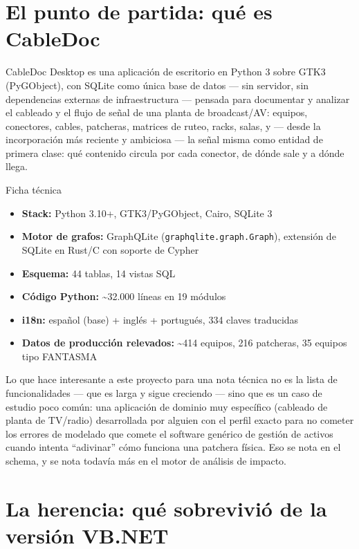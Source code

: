 \documentclass[11pt,twocolumn]{article}
\begin{document}
\section{El punto de partida: qué es CableDoc}

CableDoc Desktop es una aplicación de escritorio en Python 3 sobre GTK3 (PyGObject), con SQLite como única base de datos --- sin servidor, sin dependencias externas de infraestructura --- pensada para documentar y analizar el cableado y el flujo de señal de una planta de broadcast/AV: equipos, conectores, cables, patcheras, matrices de ruteo, racks, salas, y --- desde la incorporación más reciente y ambiciosa --- la señal misma como entidad de primera clase: qué contenido circula por cada conector, de dónde sale y a dónde llega.

\begin{specbox}{Ficha técnica}
\begin{itemize}[leftmargin=1.1em,itemsep=1pt,topsep=2pt]
\item \textbf{Stack:} Python 3.10+, GTK3/PyGObject, Cairo, SQLite 3
\item \textbf{Motor de grafos:} GraphQLite (\texttt{graphqlite.graph.Graph}), extensión de SQLite en Rust/C con soporte de Cypher
\item \textbf{Esquema:} 44 tablas, 14 vistas SQL
\item \textbf{Código Python:} \textasciitilde32.000 líneas en 19 módulos
\item \textbf{i18n:} español (base) + inglés + portugués, 334 claves traducidas
\item \textbf{Datos de producción relevados:} \textasciitilde414 equipos, 216 patcheras, 35 equipos tipo FANTASMA
\end{itemize}
\end{specbox}

Lo que hace interesante a este proyecto para una nota técnica no es la lista de funcionalidades --- que es larga y sigue creciendo --- sino que es un caso de estudio poco común: una aplicación de dominio muy específico (cableado de planta de TV/radio) desarrollada por alguien con el perfil exacto para no cometer los errores de modelado que comete el software genérico de gestión de activos cuando intenta ``adivinar'' cómo funciona una patchera física. Eso se nota en el schema, y se nota todavía más en el motor de análisis de impacto.

\section{La herencia: qué sobrevivió de la versión VB.NET}
\end{document}
